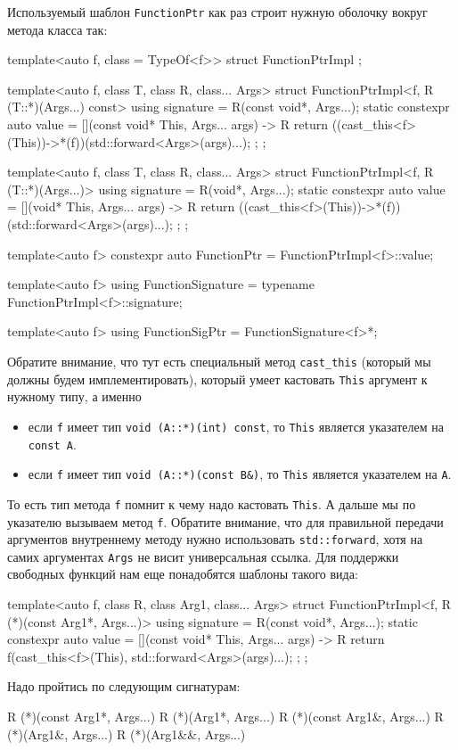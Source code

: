 Используемый шаблон \verb"FunctionPtr" как раз строит нужную оболочку вокруг метода класса так:
\begin{cppcode}
template<auto f, class = TypeOf<f>>
struct FunctionPtrImpl {};

template<auto f, class T, class R, class... Args>
struct FunctionPtrImpl<f, R (T::*)(Args...) const> {
  using signature = R(const void*, Args...);
  static constexpr auto value = [](const void* This, Args... args) -> R {
    return ((cast_this<f>(This))->*(f))(std::forward<Args>(args)...);
  };
};

template<auto f, class T, class R, class... Args>
struct FunctionPtrImpl<f, R (T::*)(Args...)> {
  using signature = R(void*, Args...);
  static constexpr auto value = [](void* This, Args... args) -> R {
    return ((cast_this<f>(This))->*(f))(std::forward<Args>(args)...);
  };
};

template<auto f>
constexpr auto FunctionPtr = FunctionPtrImpl<f>::value;

template<auto f>
using FunctionSignature = typename FunctionPtrImpl<f>::signature;

template<auto f>
using FunctionSigPtr = FunctionSignature<f>*;
\end{cppcode}
Обратите внимание, что тут есть специальный метод \verb"cast_this" (который мы должны будем имплементировать), который умеет кастовать \verb"This" аргумент к нужному типу, а именно
\begin{itemize}
\item если \verb"f" имеет тип \verb"void (A::*)(int) const", то \verb"This" является указателем на \verb"const A".

\item если \verb"f" имеет тип \verb"void (A::*)(const B&)", то \verb"This" является указателем на \verb"A".
\end{itemize}
То есть тип метода \verb"f" помнит к чему надо кастовать \verb"This".
А дальше мы по указателю вызываем метод \verb"f".
Обратите внимание, что для правильной передачи аргументов внутреннему методу нужно использовать \verb"std::forward", хотя на самих аргументах \verb"Args" не висит универсальная ссылка.
Для поддержки свободных функций нам еще понадобятся шаблоны такого вида:
\begin{cppcode}
template<auto f, class R, class Arg1, class... Args>
struct FunctionPtrImpl<f, R (*)(const Arg1*, Args...)> {
  using signature = R(const void*, Args...);
  static constexpr auto value = [](const void* This, Args... args) -> R {
    return f(cast_this<f>(This), std::forward<Args>(args)...);
  };
};
\end{cppcode}
Надо пройтись по следующим сигнатурам:
\begin{cppcode}[numbers = none]
R (*)(const Arg1*, Args...)
R (*)(Arg1*, Args...)
R (*)(const Arg1&, Args...)
R (*)(Arg1&, Args...)
R (*)(Arg1&&, Args...)
\end{cppcode}

